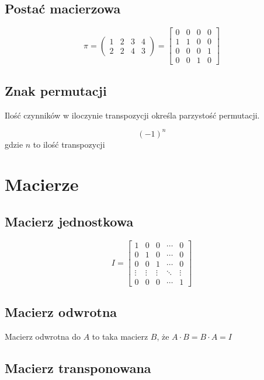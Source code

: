 \documentclass{../notatki}
\begin{document}
\subsection{Postać macierzowa}

$$
\pi = 
\begin{pmatrix}
    1 & 2 & 3 & 4\\
    2 & 2 & 4 & 3
\end{pmatrix}
= 
\begin{bmatrix}
    0 & 0 & 0 & 0\\
    1 & 1 & 0 & 0\\
    0 & 0 & 0 & 1\\
    0 & 0 & 1 & 0
\end{bmatrix}
$$

\subsection{Znak permutacji}

Ilość czynników w iloczynie transpozycji określa parzystość permutacji.

$$(-1)^n$$ gdzie $n$ to ilość transpozycji

\section{Macierze}

\subsection{Macierz jednostkowa}

$$
I =
\begin{bmatrix}
    1 & 0 & 0 & \cdots & 0 \\
    0 & 1 & 0 & \cdots & 0 \\
    0 & 0 & 1 & \cdots & 0 \\
    \vdots & \vdots & \vdots & \ddots & \vdots \\
    0 & 0 & 0 & \cdots & 1
\end{bmatrix}
$$

\subsection{Macierz odwrotna}

Macierz odwrotna do $A$ to taka macierz $B$, że $A \cdot B = B \cdot A = I$

\subsection{Macierz transponowana}
\end{document}
